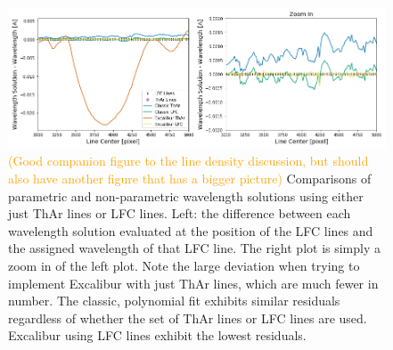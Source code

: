 \documentclass[twocolumn]{aastex63}
\newcommand{\lz}[1]{\textcolor{orange}{#1}}
\begin{document}
\begin{figure}[h]
\centering
\includegraphics[width=\textwidth]{Figures/waveResids.png}
\caption{\lz{(Good companion figure to the line density discussion, but should also have another figure that has a bigger picture)} Comparisons of parametric and non-parametric wavelength solutions using either just ThAr lines or LFC lines. Left: the difference between each wavelength solution evaluated at the position of the LFC lines and the assigned wavelength of that LFC line.  The right plot is simply a zoom in of the left plot.  Note the large deviation when trying to implement Excalibur with just ThAr lines, which are much fewer in number.  The classic, polynomial  fit exhibits similar residuals regardless of whether the set of ThAr lines or LFC lines are used.  Excalibur using LFC lines exhibit the lowest residuals.}
\label{fig:waveResids}
\end{figure} 
\end{document}

